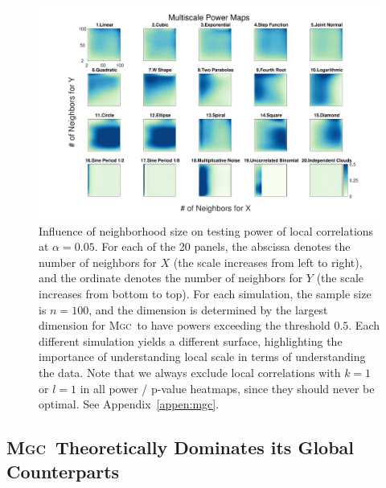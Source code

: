 \documentclass[11pt]{article}
\providecommand{\sct}[1]{{\normalfont\textsc{#1}}}
\newcommand{\Mgc}{\sct{Mgc}}
\begin{document}
\begin{figure}[htbp]
\includegraphics[width=1.0\textwidth]{../Figures/FigHDHeat}
\caption{Influence of neighborhood size on testing power of local correlations at $\alpha=0.05$.
For each of the 20 panels, the abscissa denotes the number of neighbors for $X$ (the scale increases from left to right), and the ordinate denotes the number of neighbors for $Y$ (the scale increases from bottom to top). For each simulation, the sample size is $n=100$, and the dimension is determined by the largest dimension for \Mgc~to have powers exceeding the threshold $0.5$. Each different simulation yields a different surface, highlighting the importance of understanding local scale in terms of understanding the data. Note that we always exclude local correlations with $k=1$ or $l=1$ in all power / p-value heatmaps, since they should never be optimal. See Appendix~\ref{appen:mgc}.}
\label{f:powermaps}
\end{figure}


\subsection*{\Mgc~Theoretically Dominates its Global Counterparts}
\label{s:theory}
\end{document}
